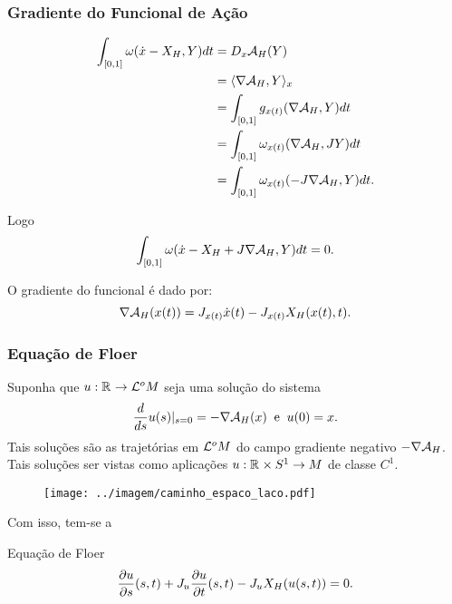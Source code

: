 \documentclass{beamer}
\begin{document}
	\begin{frame}
		\frametitle{Gradiente do Funcional de Ação}
		\begin{footnotesize}
		$$
		\begin{aligned}
		\int_{[0,1]} \omega(\dot{x} - X_{H}, Y)dt&=
		D_{x}\mathcal{A}_{H}(Y)
		\\ 
		&= \langle \nabla \mathcal{A}_{H}, Y \rangle_{x}
		\\
		&= \int_{[0,1]}g_{x(t)}(\nabla \mathcal{A}_{H}, Y)dt
		\\
		&=\int_{[0,1]} \omega_{x(t)}(\nabla \mathcal{A}_{H}, JY)dt
		\\
		&=\int_{[0,1]} \omega_{x(t)}(-J\nabla \mathcal{A}_{H}, Y)dt.
		\end{aligned}
		$$
				
			
		Logo
		$$
		\int_{[0,1]} \omega(\dot{x} - X_{H} + J\nabla \mathcal{A}_{H}, Y)dt = 0.
		$$
		\begin{block}{O gradiente do funcional é dado por:}
			$$
			\nabla \mathcal{A}_{H}(x(t))= J_{x(t)}\dot{x}(t)-J_{x(t)}X_{H}(x(t), t).
			$$
		\end{block}
		\end{footnotesize}
	\end{frame}
	
	\begin{frame}
		\frametitle{Equação de Floer}
		\begin{footnotesize}
	Suponha que $u :\mathbb{R}^{}\to \mathcal{L}^{o}M$ seja uma solução do sistema 
	$$
	\frac{d }{d s}u(s)|_{s=0} = -\nabla \mathcal{A}_{H}(x) \;\;\text{e}\;\;u(0)=x.
	$$
	Tais soluções são as trajetórias em $\mathcal{L}^{o}M$ do campo gradiente negativo $-\nabla \mathcal{A}_{H}$. Tais soluções ser vistas como aplicações $u:\mathbb{R}^{} \times S^{1} \to M$ de classe $C^{1}$.
	\begin{figure}[!h]
		\centering
		\texttt{[image: ../imagem/caminho\_espaco\_laco.pdf]}
	\end{figure} 
		
		Com isso, tem-se a
		\begin{block}{Equação de Floer}
			$$
			\frac{\partial u}{\partial s}(s,t) + J_{u}\frac{\partial u}{\partial t}(s,t) - J_{u}X_{H}(u(s,t))=0.
			$$
		\end{block}
		\end{footnotesize}
	\end{frame}
	
\end{document}
